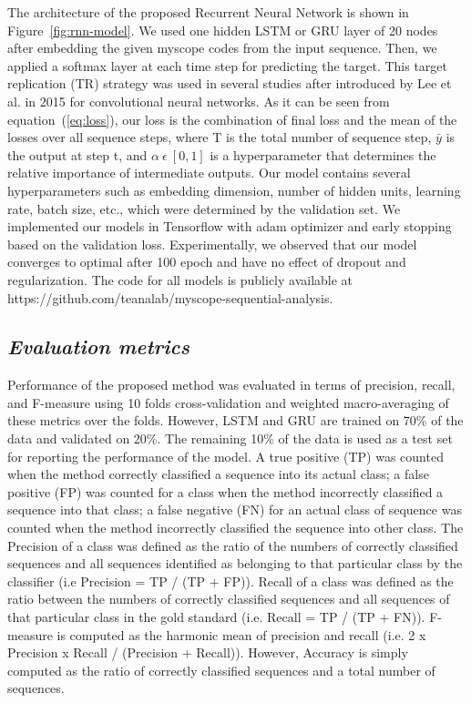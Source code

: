 \documentclass{amia_summit_2018}
\begin{document}
The architecture of the proposed Recurrent Neural Network is shown in Figure~\ref{fig:rnn-model}. We used one hidden LSTM or GRU layer of 20 nodes after embedding the given myscope codes from the input sequence. Then, we applied a softmax layer at each time step for predicting the target. This target replication (TR) strategy was used in several studies \cite{lipton2015learning,choi2016doctor} after introduced by Lee et al.\cite{lee2015deeply} in 2015 for convolutional neural networks. As it can be seen from equation~(\ref{eq:loss}), our loss is the combination of final loss and the mean of the losses over all sequence steps, where T is the total number of sequence step, $\bar y$ is the output at step t, and $\alpha\ \epsilon\ [0, 1]$ is a hyperparameter that determines the relative importance of intermediate outputs. Our model contains several hyperparameters such as embedding dimension, number of hidden units, learning rate, batch size, etc., which were determined by the validation set. We implemented our models in Tensorflow with adam optimizer and early stopping based on the validation loss. Experimentally, we observed that our model converges to optimal after 100 epoch and have no effect of dropout and regularization. The code for all models is publicly available at https://github.com/teanalab/myscope-sequential-analysis.   
  
\subsection*{\textit{Evaluation metrics}}
Performance of the proposed method was evaluated in terms of precision, recall, and F-measure using 10 folds cross-validation and weighted macro-averaging of these metrics over the folds. However, LSTM and GRU are trained on 70\% of the data and validated on 20\%. The remaining 10\% of the data is used as a test set for reporting the performance of the model. A true positive (TP) was counted when the method correctly classified a sequence into its actual class; a false positive (FP) was counted for a class when the method incorrectly classified a sequence into that class; a false negative (FN) for an actual class of sequence was counted when the method incorrectly classified the sequence into other class. The Precision of a class was defined as the ratio of the numbers of correctly classified sequences and all sequences identified as belonging to that particular class by the classifier (i.e Precision = TP / (TP + FP)). Recall of a class was defined as the ratio between the numbers of correctly classified sequences and all sequences of that particular class in the gold standard (i.e. Recall = TP / (TP + FN)). F-measure is computed as the harmonic mean of precision and recall (i.e. 2 x Precision x Recall / (Precision + Recall)). However, Accuracy is simply computed as the ratio of correctly classified sequences and a total number of sequences.   
\end{document}
